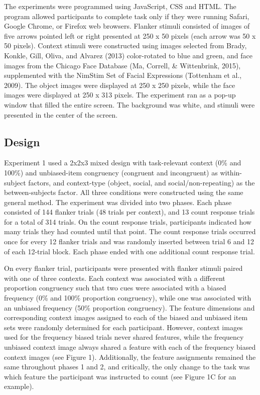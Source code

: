 \documentclass[english,,man,floatsintext]{apa6}
\begin{document}
The experiments were programmed using JavaScript, CSS and HTML. The
program allowed participants to complete task only if they were running
Safari, Google Chrome, or Firefox web browsers. Flanker stimuli
consisted of images of five arrows pointed left or right presented at
250 x 50 pixels (each arrow was 50 x 50 pixels). Context stimuli were
constructed using images selected from Brady, Konkle, Gill, Oliva, and
Alvarez (2013) color-rotated to blue and green, and face images from the
Chicago Face Database (Ma, Correll, \& Wittenbrink, 2015), supplemented
with the NimStim Set of Facial Expressions (Tottenham et al., 2009). The
object images were displayed at 250 x 250 pixels, while the face images
were displayed at 250 x 313 pixels. The experiment ran as a pop-up
window that filled the entire screen. The background was white, and
stimuli were presented in the center of the screen.

\subsection{Design}\label{design}

Experiment 1 used a 2x2x3 mixed design with task-relevant context (0\%
and 100\%) and unbiased-item congruency (congruent and incongruent) as
within-subject factors, and context-type (object, social, and
social/non-repeating) as the between-subjects factor. All three
conditions were constructed using the same general method. The
experiment was divided into two phases. Each phase consisted of 144
flanker trials (48 trials per context), and 13 count response trials for
a total of 314 trials. On the count response trials, participants
indicated how many trials they had counted until that point. The count
response trials occurred once for every 12 flanker trials and was
randomly inserted between trial 6 and 12 of each 12-trial block. Each
phase ended with one additional count response trial.

On every flanker trial, participants were presented with flanker stimuli
paired with one of three contexts. Each context was associated with a
different proportion congruency such that two cues were associated with
a biased frequency (0\% and 100\% proportion congruency), while one was
associated with an unbiased frequency (50\% proportion congruency). The
feature dimensions and corresponding context images assigned to each of
the biased and unbiased item sets were randomly determined for each
participant. However, context images used for the frequency biased
trials never shared features, while the frequency unbiased context image
always shared a feature with each of the frequency biased context images
(see Figure 1). Additionally, the feature assignments remained the same
throughout phases 1 and 2, and critically, the only change to the task
was which feature the participant was instructed to count (see Figure 1C
for an example).
\end{document}
